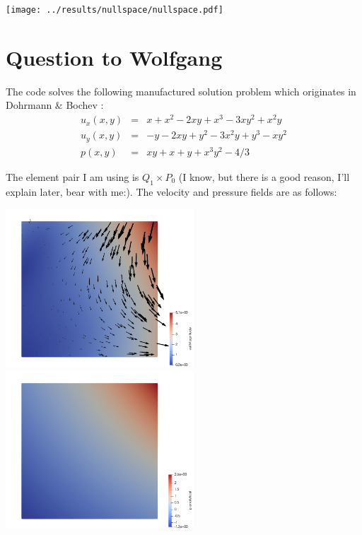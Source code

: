 \documentclass[a4paper,12pt]{article}
\begin{document}
\begin{center}
\texttt{[image: ../results/nullspace/nullspace.pdf]}
\end{center}





\newpage
\section{Question to Wolfgang}

The code solves the following manufactured solution problem
which originates in Dohrmann \& Bochev \cite{dobo04}: 
\begin{eqnarray}
u_x(x,y) &=& x+x^2 - 2xy+x^3 - 3xy^2 + x^2y \\
u_y(x,y) &=& -y-2xy+y^2 -3x^2y + y^3 - xy^2 \\
p(x,y) &=& xy+x+y+x^3y^2 - 4/3
\end{eqnarray}

The element pair I am using is $Q_1\times P_0$ (I know, but there is a good reason, I'll 
explain later, bear with me:).
The velocity and pressure fields are as follows:

\begin{center}
\includegraphics[width=7cm]{../results/exp09/vel.png}
\includegraphics[width=7cm]{../results/exp09/press.png}
\end{center}
\end{document}
